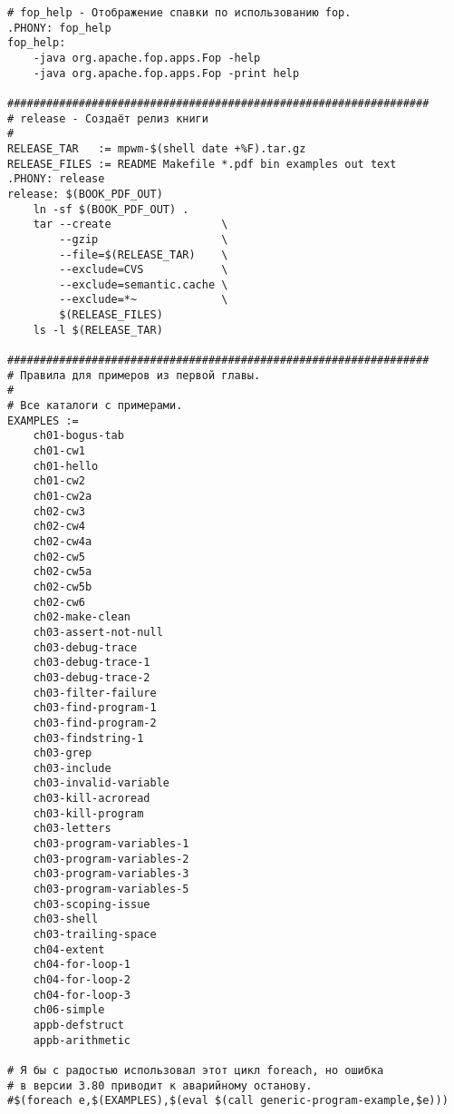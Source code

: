 {\begin{verbatim}
# fop_help - Отображение спавки по использованию fop.
.PHONY: fop_help
fop_help:
    -java org.apache.fop.apps.Fop -help
    -java org.apache.fop.apps.Fop -print help

#################################################################
# release - Создаёт релиз книги
#
RELEASE_TAR   := mpwm-$(shell date +%F).tar.gz
RELEASE_FILES := README Makefile *.pdf bin examples out text
.PHONY: release
release: $(BOOK_PDF_OUT)
    ln -sf $(BOOK_PDF_OUT) .
    tar --create                 \
        --gzip                   \
        --file=$(RELEASE_TAR)    \
        --exclude=CVS            \
        --exclude=semantic.cache \
        --exclude=*~             \
        $(RELEASE_FILES)
    ls -l $(RELEASE_TAR)

#################################################################
# Правила для примеров из первой главы.
#
# Все каталоги с примерами.
EXAMPLES :=
    ch01-bogus-tab
    ch01-cw1
    ch01-hello
    ch01-cw2
    ch01-cw2a
    ch02-cw3
    ch02-cw4
    ch02-cw4a
    ch02-cw5
    ch02-cw5a
    ch02-cw5b
    ch02-cw6
    ch02-make-clean
    ch03-assert-not-null
    ch03-debug-trace
    ch03-debug-trace-1
    ch03-debug-trace-2
    ch03-filter-failure
    ch03-find-program-1
    ch03-find-program-2
    ch03-findstring-1
    ch03-grep
    ch03-include
    ch03-invalid-variable
    ch03-kill-acroread
    ch03-kill-program
    ch03-letters
    ch03-program-variables-1
    ch03-program-variables-2
    ch03-program-variables-3
    ch03-program-variables-5
    ch03-scoping-issue
    ch03-shell
    ch03-trailing-space
    ch04-extent
    ch04-for-loop-1
    ch04-for-loop-2
    ch04-for-loop-3
    ch06-simple
    appb-defstruct
    appb-arithmetic

# Я бы с радостью использовал этот цикл foreach, но ошибка
# в версии 3.80 приводит к аварийному останову.
#$(foreach e,$(EXAMPLES),$(eval $(call generic-program-example,$e)))


\end{verbatim}}
